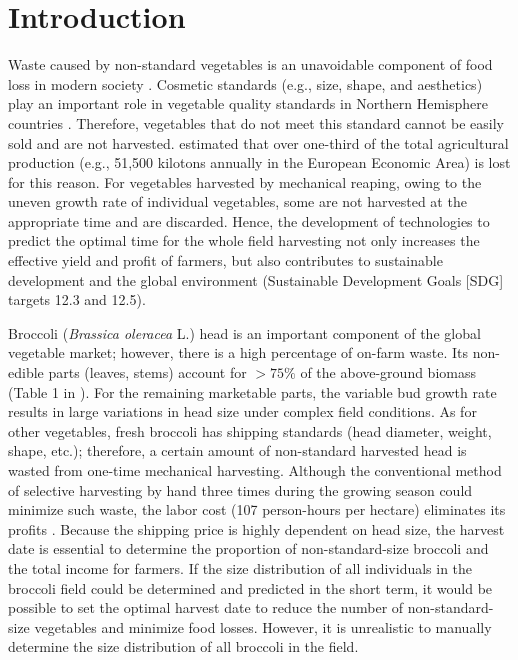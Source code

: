 \section{Introduction}

Waste caused by non-standard vegetables is an unavoidable component of food loss in modern society \citep{parfitt_food_2010,teuber_food_2016}. Cosmetic standards (e.g., size, shape, and aesthetics) play an important role in vegetable quality standards in Northern Hemisphere countries \citep{porter_avoidable_2018}. Therefore, vegetables that do not meet this standard cannot be easily sold and are not harvested\citet{garrone_opening_2014}. \citet{porter_avoidable_2018} estimated that over one-third of the total agricultural production (e.g., 51,500 kilotons annually in the European Economic Area) is lost for this reason. For vegetables harvested by mechanical reaping, owing to the uneven growth rate of individual vegetables, some are not harvested at the appropriate time and are discarded. Hence, the development of technologies to predict the optimal time for the whole field harvesting not only increases the effective yield and profit of farmers, but also contributes to sustainable development and the global environment (Sustainable Development Goals [SDG] targets 12.3 and 12.5).

Broccoli (\textit{Brassica oleracea} L.) head is an important component of the global vegetable market; however, there is a high percentage of on-farm waste. Its non-edible parts (leaves, stems) account for $> 75\%$ of the above-ground biomass (Table 1 in \citet{fink_nitrogen_1999}). For the remaining marketable parts, the variable bud growth rate results in large variations in head size under complex field conditions. As for other vegetables, fresh broccoli has shipping standards (head diameter, weight, shape, etc.); therefore, a certain amount of non-standard harvested head is wasted from one-time mechanical harvesting. Although the conventional method of selective harvesting by hand three times during the growing season could minimize such waste, the labor cost (107 person-hours per hectare) eliminates its profits \citep{blok_effect_2021}. Because the shipping price is highly dependent on head size, the harvest date is essential to determine the proportion of non-standard-size broccoli and the total income for farmers. If the size distribution of all individuals in the broccoli field could be determined and predicted in the short term, it would be possible to set the optimal harvest date to reduce the number of non-standard-size vegetables and minimize food losses. However, it is unrealistic to manually determine the size distribution of all broccoli in the field.

